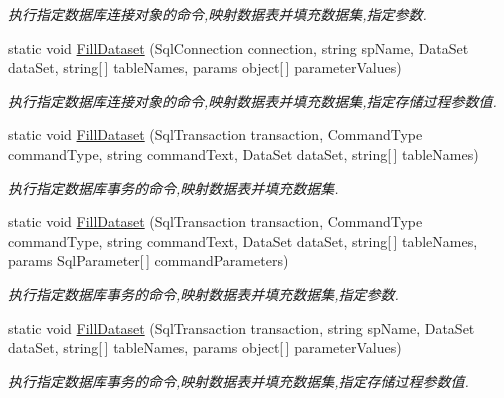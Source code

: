 \begin{DoxyCompactItemize}
\begin{DoxyCompactList}\small\item\em 执行指定数据库连接对象的命令,映射数据表并填充数据集,指定参数. \end{DoxyCompactList}\item 
static void \hyperlink{class_x_c_l_net_tools_1_1_data_base_1_1_m_s_s_q_l_1_1_sql_helper_ac33f99d73ee722075a70dbd35188ee68}{Fill\+Dataset} (Sql\+Connection connection, string sp\+Name, Data\+Set data\+Set, string\mbox{[}$\,$\mbox{]} table\+Names, params object\mbox{[}$\,$\mbox{]} parameter\+Values)
\begin{DoxyCompactList}\small\item\em 执行指定数据库连接对象的命令,映射数据表并填充数据集,指定存储过程参数值. \end{DoxyCompactList}\item 
static void \hyperlink{class_x_c_l_net_tools_1_1_data_base_1_1_m_s_s_q_l_1_1_sql_helper_a2ef17f7d356383da277662eb059a7689}{Fill\+Dataset} (Sql\+Transaction transaction, Command\+Type command\+Type, string command\+Text, Data\+Set data\+Set, string\mbox{[}$\,$\mbox{]} table\+Names)
\begin{DoxyCompactList}\small\item\em 执行指定数据库事务的命令,映射数据表并填充数据集. \end{DoxyCompactList}\item 
static void \hyperlink{class_x_c_l_net_tools_1_1_data_base_1_1_m_s_s_q_l_1_1_sql_helper_acf566f9b6876ad69bf9873e44bb832cc}{Fill\+Dataset} (Sql\+Transaction transaction, Command\+Type command\+Type, string command\+Text, Data\+Set data\+Set, string\mbox{[}$\,$\mbox{]} table\+Names, params Sql\+Parameter\mbox{[}$\,$\mbox{]} command\+Parameters)
\begin{DoxyCompactList}\small\item\em 执行指定数据库事务的命令,映射数据表并填充数据集,指定参数. \end{DoxyCompactList}\item 
static void \hyperlink{class_x_c_l_net_tools_1_1_data_base_1_1_m_s_s_q_l_1_1_sql_helper_afb18beaf4a2108c20ac7c16a46843301}{Fill\+Dataset} (Sql\+Transaction transaction, string sp\+Name, Data\+Set data\+Set, string\mbox{[}$\,$\mbox{]} table\+Names, params object\mbox{[}$\,$\mbox{]} parameter\+Values)
\begin{DoxyCompactList}\small\item\em 执行指定数据库事务的命令,映射数据表并填充数据集,指定存储过程参数值. \end{DoxyCompactList}\item 

\end{DoxyCompactItemize}
